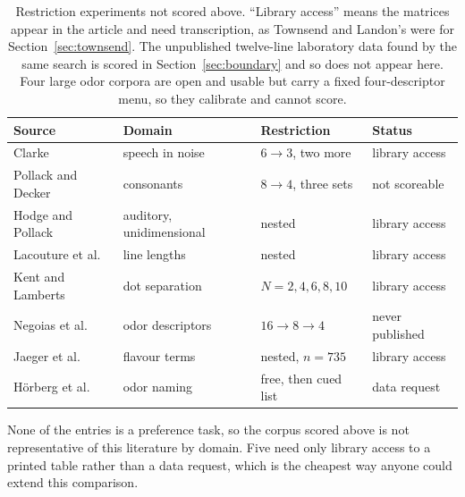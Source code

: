 \documentclass[11pt]{article}
\theoremstyle{italichead}
\begin{document}
\begin{table}[htbp]
\centering
\small
\begin{tabular}{llll}
\toprule
Source & Domain & Restriction & Status \\
\midrule
Clarke \cite{clarke1957} & speech in noise & $6 \to 3$, two more & library access \\
Pollack and Decker \cite{pollackdecker1960} & consonants & $8 \to 4$, three sets & not scoreable\footnotemark[10] \\
Hodge and Pollack \cite{hodgepollack1962} & auditory, unidimensional & nested & library access \\
Lacouture et al.\ \cite{lacouture1998} & line lengths & nested & library access \\
Kent and Lamberts \cite{kentlamberts2005} & dot separation & $N = 2,4,6,8,10$ & library access \\
Negoias et al.\ \cite{negoias2010} & odor descriptors & $16 \to 8 \to 4$ & never published \\
Jaeger et al.\ \cite{jaeger2015} & flavour terms & nested, $n = 735$ & library access \\
H\"orberg et al.\ \cite{horberg2025} & odor naming & free, then cued list & data request \\
\bottomrule
\end{tabular}
\caption{Restriction experiments not scored above. ``Library access'' means the matrices
appear in the article and need transcription, as Townsend and Landon's were for
Section~\ref{sec:townsend}. The unpublished twelve-line laboratory data found by the same search
is scored in Section~\ref{sec:boundary} and so does not appear here. Four large odor corpora are open and usable but carry a fixed
four-descriptor menu, so they calibrate and cannot score.}
\label{tab:census}
\end{table}


None of the entries is a preference task, so the corpus scored above is not representative of
this literature by domain. Five need only library access to a printed table rather than a data
request, which is the cheapest way anyone could extend this comparison.
\end{document}
